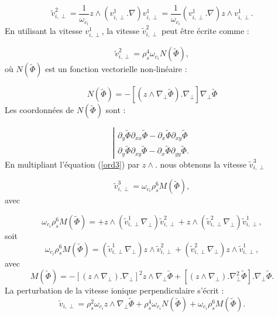\documentclass{book}
\begin{document}
\begin{equation}
\tilde{v}_{i,\perp}^2
=\frac{1}{\omega_{c_i}}z\wedge(v_{i,\perp}^1.\nabla )v_{i,\perp}^1
=\frac{1}{\omega_{c_i}}(v_{i,\perp}^1.\nabla )z\wedge v_{i,\perp}^1.
\end{equation}
En utilisant la vitesse $v_{i,\perp}^1$, 
la vitesse  $\tilde{v}_{i,\perp}^2$ 
peut \^etre \'ecrite comme :


\begin{equation}
\tilde{v}_{i,\perp}^2=\rho_s^4\omega_{c_i}N(\tilde{\Phi}),
\end{equation}
o\`u $N(\tilde{\Phi})$ est un fonction vectorielle non-lin\'eaire :

\begin{equation}
N(\tilde{\Phi})=-[(z\wedge \nabla_\perp \tilde \Phi).\nabla_\perp]
\nabla_\perp \tilde\Phi
\end{equation}
Les coordonn\'ees de $N(\tilde{\Phi})$ sont : 

\begin{equation}
\left| 
\begin{array}{l}
\partial_y\tilde{\Phi}\partial_{x x}\tilde{\Phi}
-\partial_x\tilde{\Phi}\partial_{x y}\tilde{\Phi}\\
\partial_y\tilde{\Phi}\partial_{x y}\tilde{\Phi}
-\partial_x\tilde{\Phi}\partial_{y y}\tilde{\Phi}.
\end{array}
\right.
\end{equation}
En multipliant l'\'equation (\ref{ord3}) par $z\wedge .$  nous obtenons la vitesse
$\tilde{v}_{i,\perp}^3$ 


\begin{equation}
\tilde{v}_{i,\perp}^3=
\omega_{c_i}\rho_s^6M(\tilde\Phi),
\end{equation}
avec

\begin{equation}
\omega_{c_i}\rho_s^6M(\tilde\Phi)=
+z\wedge(\tilde{v}_{i,\perp}^1\nabla_\perp)\tilde{v}_{i,\perp}^2
+z\wedge(\tilde{v}_{i,\perp}^2\nabla_\perp)\tilde{v}_{i,\perp}^1,
\end{equation}
soit
\begin{equation}
\omega_{c_i}\rho_s^6M(\tilde\Phi)=
(\tilde{v}_{i,\perp}^1\nabla_\perp)z\wedge\tilde{v}_{i,\perp}^2
+(\tilde{v}_{i,\perp}^2\nabla_\perp)z\wedge\tilde{v}_{i,\perp}^1,
\end{equation}
avec
\begin{equation}
M(\tilde\Phi)=-[(z\wedge\nabla_\perp).\nabla_\perp]^2
z\wedge \nabla_\perp \tilde\Phi
+[(z\wedge\nabla_\perp).\nabla_\perp^2\tilde\Phi].\nabla_\perp\tilde\Phi.
\end{equation}
La perturbation de la vitesse ionique perpendiculaire
s'\'ecrit :
\begin{equation}\label{vition}
\tilde v_{i,\perp}=\rho_s^2\omega_{c_i}z\wedge\nabla_\perp\tilde\Phi
+\rho_s^4\omega_{c_i}N(\tilde{\Phi})+\omega_{c_i}\rho_s^6M(\tilde\Phi).
\end{equation}
\end{document}
